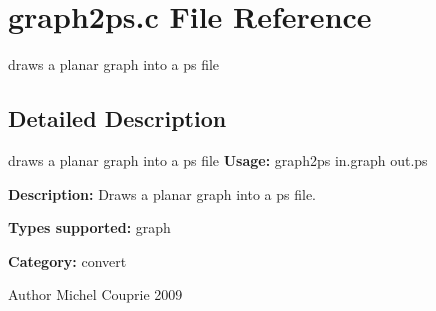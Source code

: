\section{graph2ps.c File Reference}
\label{graph2ps_8c}


draws a planar graph into a ps file  




\subsection{Detailed Description}
draws a planar graph into a ps file {\bfseries Usage:} graph2ps in.graph out.ps

{\bfseries Description:} Draws a planar graph into a ps file.

{\bfseries Types supported:} graph

{\bfseries Category:} convert

\begin{DoxyAuthor}{Author}
Michel Couprie 2009 
\end{DoxyAuthor}
